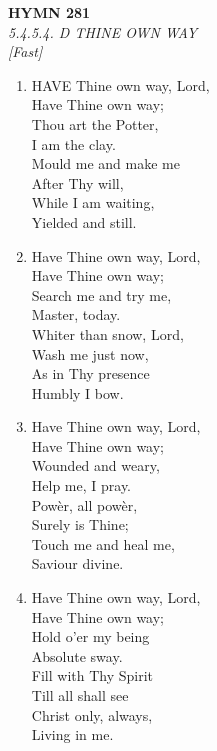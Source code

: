 \documentclass[11pt,a4paper]{article}
\begin{document}
\newpage
\begin{center}
    {\Large \textbf{HYMN 281}}
    \\
    \textit{5.4.5.4. D THINE OWN WAY}
    \\
    \textit{\small [Fast]}
\end{center}
\vspace{1em}

\begin{enumerate}
    \item HAVE Thine own way, Lord, \\
        Have Thine own way; \\
        Thou art the Potter, \\
        I am the clay. \\
        Mould me and make me \\
        After Thy will, \\
        While I am waiting, \\
        Yielded and still.

    \item Have Thine own way, Lord, \\
        Have Thine own way; \\
        Search me and try me, \\
        Master, today. \\
        Whiter than snow, Lord, \\
        Wash me just now, \\
        As in Thy presence \\
        Humbly I bow.

    \item Have Thine own way, Lord, \\
        Have Thine own way; \\
        Wounded and weary, \\
        Help me, I pray. \\
        Pow\`er, all pow\`er, \\
        Surely is Thine; \\
        Touch me and heal me, \\
        Saviour divine.

    \item Have Thine own way, Lord, \\
        Have Thine own way; \\
        Hold o'er my being \\
        Absolute sway. \\
        Fill with Thy Spirit \\
        Till all shall see \\
        Christ only, always, \\
        Living in me.

\end{enumerate}
\end{document}
